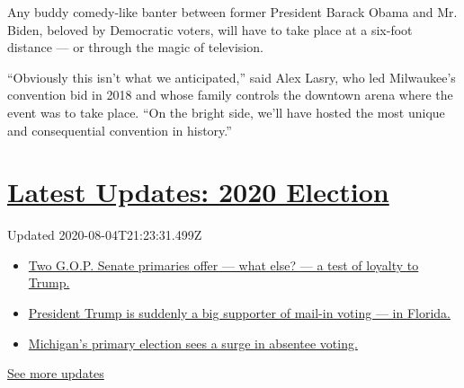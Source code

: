 Any buddy comedy-like banter between former President Barack Obama and
Mr. Biden, beloved by Democratic voters, will have to take place at a
six-foot distance --- or through the magic of television.

``Obviously this isn't what we anticipated,'' said Alex Lasry, who led
Milwaukee's convention bid in 2018 and whose family controls the
downtown arena where the event was to take place. ``On the bright side,
we'll have hosted the most unique and consequential convention in
history.''

\hypertarget{latest-updates-2020-election}{%
\section{\texorpdfstring{\href{https://www.nytimes3xbfgragh.onion/2020/08/04/us/elections/primary-election-michigan-arizona-kansas.html?action=click\&pgtype=Article\&state=default\&region=MAIN_CONTENT_1\&context=storylines_live_updates}{Latest
Updates: 2020
Election}}{Latest Updates: 2020 Election}}\label{latest-updates-2020-election}}

Updated 2020-08-04T21:23:31.499Z

\begin{itemize}
\tightlist
\item
  \href{https://www.nytimes3xbfgragh.onion/2020/08/04/us/elections/primary-election-michigan-arizona-kansas.html?action=click\&pgtype=Article\&state=default\&region=MAIN_CONTENT_1\&context=storylines_live_updates\#link-3924dd44}{Two
  G.O.P. Senate primaries offer --- what else? --- a test of loyalty to
  Trump.}
\item
  \href{https://www.nytimes3xbfgragh.onion/2020/08/04/us/elections/primary-election-michigan-arizona-kansas.html?action=click\&pgtype=Article\&state=default\&region=MAIN_CONTENT_1\&context=storylines_live_updates\#link-32b39e33}{President
  Trump is suddenly a big supporter of mail-in voting --- in Florida.}
\item
  \href{https://www.nytimes3xbfgragh.onion/2020/08/04/us/elections/primary-election-michigan-arizona-kansas.html?action=click\&pgtype=Article\&state=default\&region=MAIN_CONTENT_1\&context=storylines_live_updates\#link-ab1004d}{Michigan's
  primary election sees a surge in absentee voting.}
\end{itemize}

\href{https://www.nytimes3xbfgragh.onion/2020/08/04/us/elections/primary-election-michigan-arizona-kansas.html?action=click\&pgtype=Article\&state=default\&region=MAIN_CONTENT_1\&context=storylines_live_updates}{See
more updates}

